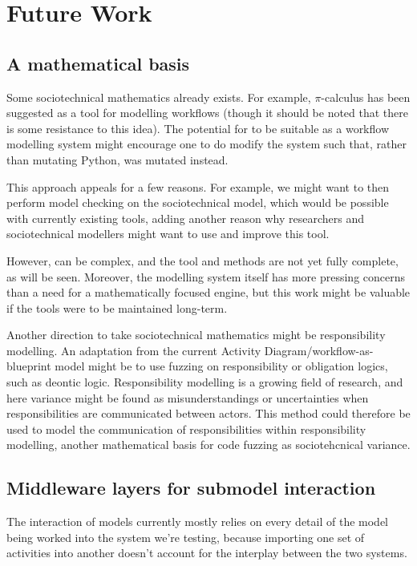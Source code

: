 \chapter{Future Work} %
\label{future_work_head}

\section{A mathematical basis}
Some sociotechnical mathematics already exists. For example, \(\pi\)-calculus has been suggested as a tool for modelling workflows\cite{Smith2003} (though it should be noted that there is some resistance to this idea\cite{Aalst2004}). The potential for \picalc to be suitable as a workflow modelling system might encourage one to do modify the system such that, rather than mutating Python, \picalc was mutated instead. \par

This approach appeals for a few reasons. For example, we might want to then perform model checking on the sociotechnical model, which would be possible with currently existing tools\cite{Tiu2005}, adding another reason why researchers and sociotechnical modellers might want to use and improve this tool. \par

However, \picalc can be complex, and the tool and methods are not yet fully complete, as will be seen. Moreover, the modelling system itself has more pressing concerns than a need for a mathematically focused engine, but this work might be valuable if the tools were to be maintained long-term. \par

Another direction to take sociotechnical mathematics might be responsibility modelling. An adaptation from the current Activity Diagram/workflow-as-blueprint model might be to use fuzzing on responsibility or obligation logics, such as deontic logic\cite{Hutchison2008}. Responsibility modelling is a growing field of research, and here variance might be found as misunderstandings or uncertainties when responsibilities are communicated between actors. This method could therefore be used to model the communication of responsibilities within responsibility modelling, another mathematical basis for code fuzzing as sociotehcnical variance. \par

\section{Middleware layers for submodel interaction}
\label{middleware-layers}
The interaction of models currently mostly relies on every detail of the model being worked into the system we're testing, because importing one set of activities into another doesn't account for the interplay between the two systems. \par

